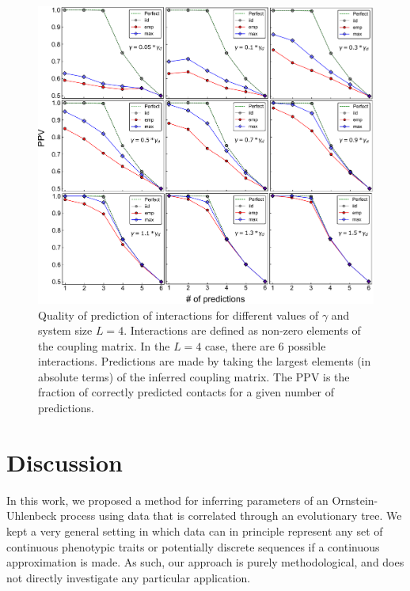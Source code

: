 \documentclass[preprint,amsmath,amssymb,superscriptaddress,showpacs,pre]{revtex4-1}
\begin{document}
\begin{figure}[!htb]
	\centering
	\includegraphics[keepaspectratio=true,width=1.0\textwidth]{Figures/PPVs_L4.pdf}
	\caption{Quality of prediction of interactions for  different values of $\gamma$ and system size $L=4$. Interactions are defined as non-zero elements of the coupling matrix. In the $L=4$ case, there are $6$ possible interactions. Predictions are made by taking the largest elements (in absolute terms) of the inferred coupling matrix. The PPV is the fraction of correctly predicted contacts for a given number of predictions.}
	\label{fig:PPV_L4}
\end{figure}


  



\section{Discussion}
\label{sec:discussion}

In this work, we proposed a method for inferring parameters of an Ornstein-Uhlenbeck process using data that is correlated through an evolutionary tree. 
We kept a very general setting in which data can in principle represent any set of continuous phenotypic traits or potentially discrete sequences if a continuous approximation is made. 
As such, our approach is purely methodological, and does not directly investigate any particular application. 
\end{document}
